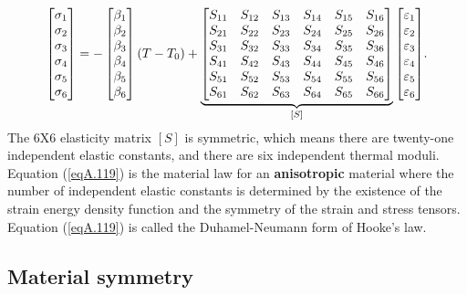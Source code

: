 \documentclass{AeroStructure-ERJohnson}
\begin{document}
\begin{align}\label{eqA.119}
\left[\begin{array}{@{}l@{}}\sigma_{1} \\\sigma_{2} \\\sigma_{3} \\\sigma_{4} \\\sigma_{5} \\\sigma_{6}\end{array}\right]=-\left[\begin{array}{@{}l@{}}\beta_{1} \\\beta_{2} \\\beta_{3} \\\beta_{4} \\\beta_{5} \\\beta_{6}\end{array}\right](T-T_{0})+ \underbrace{\left[\begin{array}{@{}llllll@{}}S_{11} & S_{12} & S_{13} & S_{14} & S_{15} & S_{16} \\S_{21} & S_{22} & S_{23} & S_{24} & S_{25} & S_{26} \\S_{31} & S_{32} & S_{33} & S_{34} & S_{35} & S_{36} \\S_{41} & S_{42} & S_{43} & S_{44} & S_{45} & S_{46} \\S_{51} & S_{52} & S_{53} & S_{54} & S_{55} & S_{56} \\S_{61} & S_{62} & S_{63} & S_{64} & S_{65} & S_{66}\end{array}\right]}_{[S]} {\left[\begin{array}{@{}l@{}}\varepsilon_{1} \\\varepsilon_{2} \\\varepsilon_{3} \\\varepsilon_{4} \\\varepsilon_{5} \\\varepsilon_{6}\end{array}\right]}.
\end{align}
The 6X6 elasticity matrix $[S]$ is symmetric, which means there are twenty-one independent elastic constants, and there are six independent thermal moduli. Equation (\ref{eqA.119}) is the material law for an \textbf{anisotropic} material where the number of independent elastic constants is determined by the existence of the strain energy density function and the symmetry of the strain and stress tensors. Equation (\ref{eqA.119}) is called the Duhamel-Neumann form of Hooke's law.

\subsection{Material symmetry}\label{secA.3.2}
\end{document}
